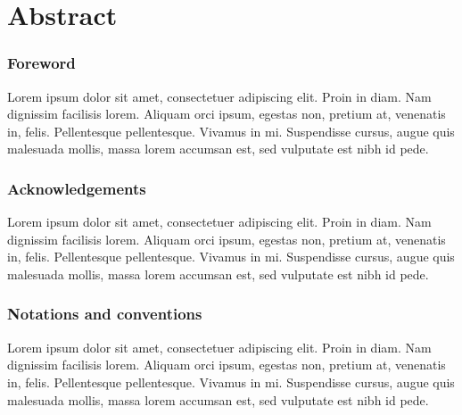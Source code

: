 
\chapter*{Abstract}

\thispagestyle{empty}


\subsection*{Foreword}
Lorem ipsum dolor sit amet, consectetuer adipiscing elit. Proin in diam. Nam dignissim facilisis lorem. Aliquam orci ipsum, egestas non, pretium at, venenatis in, felis. Pellentesque pellentesque. Vivamus in mi. Suspendisse cursus, augue quis malesuada mollis, massa lorem accumsan est, sed vulputate est nibh id pede.

\subsection*{Acknowledgements}
Lorem ipsum dolor sit amet, consectetuer adipiscing elit. Proin in diam. Nam dignissim facilisis lorem. Aliquam orci ipsum, egestas non, pretium at, venenatis in, felis. Pellentesque pellentesque. Vivamus in mi. Suspendisse cursus, augue quis malesuada mollis, massa lorem accumsan est, sed vulputate est nibh id pede.

\subsection*{Notations and conventions}
Lorem ipsum dolor sit amet, consectetuer adipiscing elit. Proin in diam. Nam dignissim facilisis lorem. Aliquam orci ipsum, egestas non, pretium at, venenatis in, felis. Pellentesque pellentesque. Vivamus in mi. Suspendisse cursus, augue quis malesuada mollis, massa lorem accumsan est, sed vulputate est nibh id pede.
